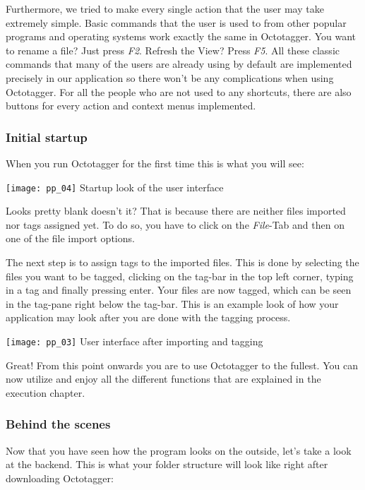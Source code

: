 Furthermore, we tried to make every single action that the user may take extremely simple. Basic commands that the user is used to from other popular programs and operating systems work exactly the same in Octotagger. You want to rename a file? Just press \textit{F2}. Refresh the View? Press \textit{F5}. All these classic commands that many of the users are already using by default are implemented precisely in our application so there won't be any complications when using Octotagger. For all the people who are not used to any shortcuts, there are also buttons for every action and context menus implemented.

\subsubsection{Initial startup}
When you run Octotagger for the first time this is what you will see:

\begin{center}
\texttt{[image: pp\_04]}
\small{Startup look of the user interface}
\end{center}


Looks pretty blank doesn't it? That is because there are neither files imported nor tags assigned yet. To do so, you have to click on the \textit{File}-Tab and then on one of the file import options.

The next step is to assign tags to the imported files. This is done by selecting the files you want to be tagged, clicking on the tag-bar in the top left corner, typing in a tag and finally pressing enter. Your files are now tagged, which can be seen in the tag-pane right below the tag-bar.
This is an example look of how your application may look after you are done with the tagging process.

\begin{center}
\texttt{[image: pp\_03]}
\small{User interface after importing and tagging}
\end{center}


Great! From this point onwards you are to use Octotagger to the fullest. You can now utilize and enjoy all the different functions that are explained in the execution chapter.

\subsubsection{Behind the scenes}
Now that you have seen how the program looks on the outside, let's take a look at the backend. This is what your folder structure will look like right after downloading Octotagger:

